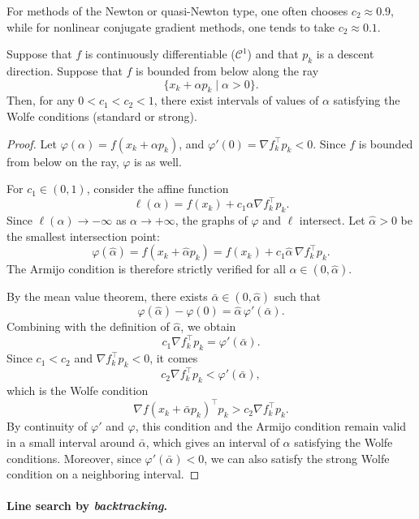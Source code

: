 \begin{remarque}
For methods of the Newton or quasi-Newton type, one often chooses
$c_2 \approx 0.9$, while for nonlinear conjugate gradient methods,
one tends to take $c_2 \approx 0.1$.
\end{remarque}

\begin{lemme}
\label{lem:Wolfe-existence}
Suppose that $f$ is continuously differentiable ($\mathcal{C}^1$) and that $p_k$ is a descent
direction. Suppose that $f$ is bounded from below along the ray
\[
    \{ x_k + \alpha p_k \;|\; \alpha > 0 \}.
\]
Then, for any $0 < c_1 < c_2 < 1$, there exist intervals of values of
$\alpha$ satisfying the Wolfe conditions (standard or strong).
\end{lemme}

\begin{proof}
Let $\varphi(\alpha) = f(x_k + \alpha p_k)$, and $\varphi'(0) = \nabla f_k^\top p_k < 0$.
Since $f$ is bounded from below on the ray, $\varphi$ is as well.

For $c_1 \in (0,1)$, consider the affine function
\[
    \ell(\alpha) = f(x_k) + c_1 \alpha \nabla f_k^\top p_k.
\]
Since $\ell(\alpha) \to -\infty$ as $\alpha \to +\infty$, the graphs of
$\varphi$ and $\ell$ intersect. Let $\hat{\alpha}>0$ be the smallest intersection
point:
\[
    \varphi(\hat{\alpha})
    = f(x_k + \hat{\alpha} p_k)
    = f(x_k) + c_1 \hat{\alpha}\,\nabla f_k^\top p_k.
\]
The Armijo condition is therefore strictly verified for all $\alpha \in (0,\hat{\alpha})$.

By the mean value theorem, there exists $\bar{\alpha} \in (0,\hat{\alpha})$ such that
\[
    \varphi(\hat{\alpha}) - \varphi(0)
    = \hat{\alpha}\,\varphi'(\bar{\alpha}).
\]
Combining with the definition of $\hat{\alpha}$, we obtain
\[
    c_1 \nabla f_k^\top p_k
    = \varphi'(\bar{\alpha}).
\]
Since $c_1 < c_2$ and $\nabla f_k^\top p_k < 0$, it comes
\[
    c_2 \nabla f_k^\top p_k < \varphi'(\bar{\alpha}),
\]
which is the Wolfe condition
\[
    \nabla f(x_k + \bar{\alpha} p_k)^\top p_k > c_2 \nabla f_k^\top p_k.
\]
By continuity of $\varphi'$ and $\varphi$, this condition and the Armijo
condition remain valid in a small interval around $\bar{\alpha}$, which
gives an interval of $\alpha$ satisfying the Wolfe conditions. Moreover,
since $\varphi'(\bar{\alpha})<0$, we can also satisfy the strong Wolfe
condition on a neighboring interval.
\end{proof}

\paragraph{Line search by \emph{backtracking}.}

